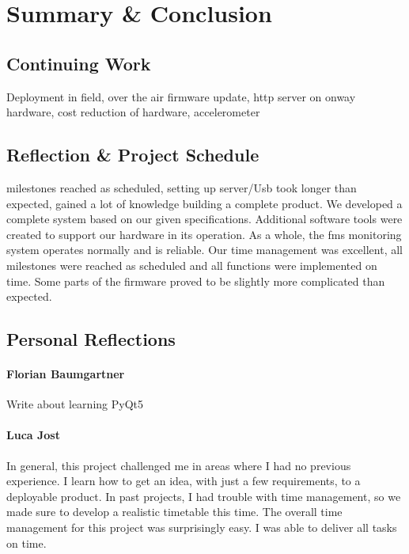 \chapter{Summary \& Conclusion}

\section{Continuing Work}
Deployment in field, over the air firmware update, http server on onway hardware, cost reduction of hardware, accelerometer

\section{Reflection \& Project Schedule}
milestones reached as scheduled, setting up server/Usb took longer than expected, gained a lot of knowledge building a complete product.  
We developed a complete system based on our given specifications. Additional software tools were created to support our hardware in its operation. As a whole, the \acrfull{fms} monitoring system operates normally and is reliable. 
Our time management was excellent, all milestones were reached as scheduled and all functions were implemented on time. Some parts of the firmware proved to be slightly more complicated than expected. 

\section{Personal Reflections}

\subsubsection{Florian Baumgartner}
Write about learning PyQt5

\subsubsection{Luca Jost}
In general, this project challenged me in areas where I had no previous experience. I learn how to get an idea, with just a few requirements, to a deployable product. In past projects, I had trouble with time management, so we made sure to develop a realistic timetable this time. The overall time management for this project was surprisingly easy. I was able to deliver all tasks on time. 